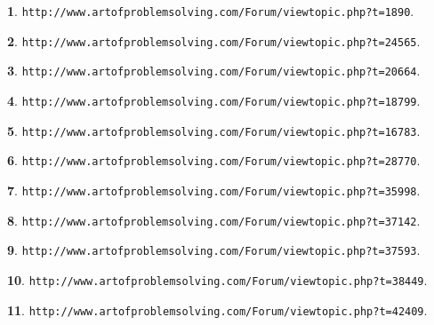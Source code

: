 \documentclass{article}
\theoremstyle{definition}
\newtheorem{s}{}
\begin{document}
\begin{s}
\texttt{http://www.artofproblemsolving.com/Forum/viewtopic.php?t=1890}.
\end{s}




\begin{s}
\texttt{http://www.artofproblemsolving.com/Forum/viewtopic.php?t=24565}.
\end{s}




\begin{s}
\texttt{http://www.artofproblemsolving.com/Forum/viewtopic.php?t=20664}.
\end{s}




\begin{s}
\texttt{http://www.artofproblemsolving.com/Forum/viewtopic.php?t=18799}.
\end{s}




\begin{s}
\texttt{http://www.artofproblemsolving.com/Forum/viewtopic.php?t=16783}.
\end{s}




\begin{s}
\texttt{http://www.artofproblemsolving.com/Forum/viewtopic.php?t=28770}.
\end{s}


\begin{s}
\texttt{http://www.artofproblemsolving.com/Forum/viewtopic.php?t=35998}.
\end{s}




\begin{s}
\texttt{http://www.artofproblemsolving.com/Forum/viewtopic.php?t=37142}.
\end{s}




\begin{s}
\texttt{http://www.artofproblemsolving.com/Forum/viewtopic.php?t=37593}.
\end{s}





\begin{s}
\texttt{http://www.artofproblemsolving.com/Forum/viewtopic.php?t=38449}.
\end{s}




\begin{s}
\texttt{http://www.artofproblemsolving.com/Forum/viewtopic.php?t=42409}.
\end{s}
\end{document}
